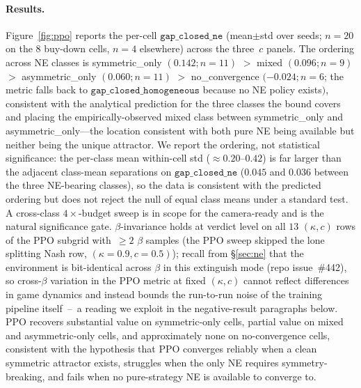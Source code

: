 \documentclass{anvil-paper}
\begin{document}
\paragraph{Results.}
Figure~\ref{fig:ppo} reports the per-cell $\texttt{gap\_closed\_ne}$
(mean$\pm$std over seeds; $n{=}20$ on the $8$ buy-down cells, $n{=}4$
elsewhere) across the three~$c$ panels. The ordering across
NE classes is
\textsf{symmetric\_only} $(0.142;n{=}11)$ $>$
\textsf{mixed} $(0.096;n{=}9)$ $>$
\textsf{asymmetric\_only} $(0.060;n{=}11)$ $>$
\textsf{no\_convergence} $(-0.024;n{=}6$; the metric falls back to
$\texttt{gap\_closed\_homogeneous}$ because no NE policy exists$)$,
consistent with the analytical prediction for the three classes the
bound covers and placing the empirically-observed \textsf{mixed} class
between \textsf{symmetric\_only} and \textsf{asymmetric\_only}---the
location consistent with both pure NE being available but neither being
the unique attractor. We report the ordering, not statistical
significance: the per-class mean within-cell std
($\approx 0.20$--$0.42$) is far larger than the adjacent class-mean
separations on $\texttt{gap\_closed\_ne}$ ($0.045$ and $0.036$ between
the three NE-bearing classes), so the data is consistent with the
predicted ordering but does not reject the null of equal class means
under a standard test. A cross-class $4{\times}$-budget sweep is in
scope for the camera-ready and is the natural significance gate.
$\beta$-invariance holds at verdict level on all $13$ $(\kappa,c)$ rows
of the PPO subgrid with~$\geq 2$ $\beta$ samples (the PPO sweep skipped
the lone splitting Nash row, $(\kappa{=}0.9, c{=}0.5)$); recall from
\S\ref{sec:ne} that the environment is bit-identical across $\beta$ in
this extinguish mode (repo issue~\#442), so cross-$\beta$ variation in
the PPO metric at fixed $(\kappa,c)$ cannot reflect differences in game
dynamics and instead bounds the run-to-run noise of the training
pipeline itself~--~a reading we exploit in the negative-result
paragraphs below. PPO recovers substantial value on
symmetric-only cells, partial value on mixed and asymmetric-only cells,
and approximately none on no-convergence cells, consistent with the
hypothesis that PPO converges reliably when a clean symmetric attractor
exists, struggles when the only NE requires symmetry-breaking, and fails
when no pure-strategy NE is available to converge to.
\end{document}
